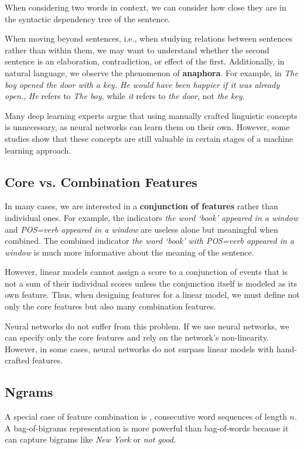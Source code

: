 When considering two words in context, we can consider how close they are in the syntactic dependency tree of the sentence.

When moving beyond sentences, i.e., when studying relations between sentences rather than within them, we may want to understand whether the second sentence is an elaboration, contradiction, or effect of the first. Additionally, in natural language, we observe the phenomenon of \textbf{anaphora}. For example, in \textit{The boy opened the door with a key. He would have been happier if it was already open.}, \textit{He} refers to \textit{The boy}, while \textit{it} refers to \textit{the door}, not \textit{the key}.

Many deep learning experts argue that using manually crafted linguistic concepts is unnecessary, as neural networks can learn them on their own. However, some studies show that these concepts are still valuable in certain stages of a machine learning approach.

\subsection{Core vs. Combination Features}
In many cases, we are interested in a \textbf{conjunction of features} rather than individual ones. For example, the indicators \textit{the word `book' appeared in a window} and \textit{POS=verb appeared in a window} are useless alone but meaningful when combined. The combined indicator \textit{the word `book' with POS=verb appeared in a window} is much more informative about the meaning of the sentence.

However, linear models cannot assign a score to a conjunction of events that is not a sum of their individual scores unless the conjunction itself is modeled as its own feature. Thus, when designing features for a linear model, we must define not only the core features but also many combination features.

Neural networks do not suffer from this problem. If we use neural networks, we can specify only the core features and rely on the network's non-linearity. However, in some cases, neural networks do not surpass linear models with hand-crafted features.

\subsection{Ngrams}
A special case of feature combination is , consecutive word sequences of length $n$. A bag-of-bigrams representation is more powerful than bag-of-words because it can capture bigrams like \textit{New York} or \textit{not good}.

